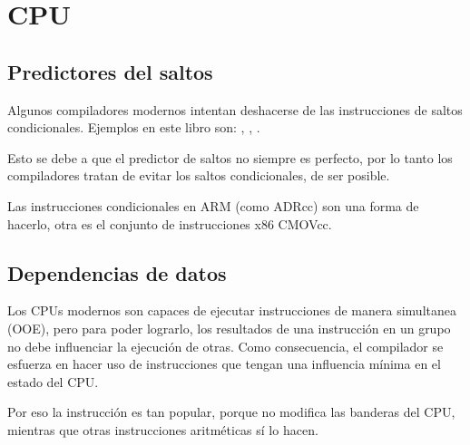 ﻿\chapter{CPU}

\section{Predictores del saltos}
\label{branch_predictors}

Algunos compiladores modernos intentan deshacerse de las instrucciones de saltos condicionales.
Ejemplos en este libro son: , , .

Esto se debe a que el predictor de saltos no siempre es perfecto, por lo tanto los compiladores
tratan de evitar los saltos condicionales, de ser posible.

Las instrucciones condicionales en ARM (como ADRcc) son una forma de hacerlo, otra es el conjunto de instrucciones x86 CMOVcc.

\section{Dependencias de datos}

Los CPUs modernos son capaces de ejecutar instrucciones de manera simultanea (\ac{OOE}), pero para
poder lograrlo, los resultados de una instrucci\'on en un grupo no debe influenciar la ejecuci\'on de otras.
Como consecuencia, el compilador se esfuerza en hacer uso de instrucciones que tengan una influencia m\'inima en el estado del CPU.

Por eso la instrucci\'on \LEA es tan popular, porque no modifica las banderas del CPU, mientras que otras instrucciones aritm\'eticas s\'i lo hacen.
